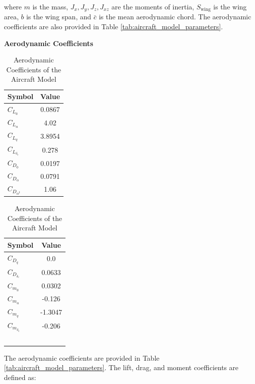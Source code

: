 \documentclass[journal,article,submit,pdftex,moreauthors]{Definitions/mdpi}
\begin{document}
where \(m\) is the mass, \(J_x, J_y, J_z, J_{xz}\) are the moments of inertia, \(S_{\text{wing}}\) is the wing area, \(b\) is the wing span, and \(\bar{c}\) is the mean aerodynamic chord. The aerodynamic coefficients are also provided in Table \ref{tab:aircraft_model_parameters}.

\begin{table}[H]
    \centering
    \label{tab:aero_coefficients}
    \textbf{Aerodynamic Coefficients} \\ %
    \vspace{0.5cm} %
    \begin{adjustbox}{valign=t}
    \begin{minipage}[t]{0.45\textwidth} %
        \centering
        \begin{tabular}{|l|c|}
            \hline
            \textbf{Symbol} & \textbf{Value} \\ \hline
            \( C_{L_0} \) & 0.0867 \\ \hline
            \( C_{L_\alpha} \) & 4.02 \\ \hline
            \( C_{L_q} \) & 3.8954 \\ \hline
            \( C_{L_{\delta_e}} \) & 0.278 \\ \hline
            \( C_{D_0} \) & 0.0197 \\ \hline
            \( C_{D_\alpha} \) & 0.0791 \\ \hline
            \( C_{D_{\alpha^2}} \) & 1.06 \\ \hline
        \end{tabular}
    \end{minipage}
    \end{adjustbox}
    \hfill
    \begin{adjustbox}{valign=t}
    \begin{minipage}[t]{0.45\textwidth} %
        \centering
        \begin{tabular}{|l|c|}
            \hline
            \textbf{Symbol} & \textbf{Value} \\ \hline
            \( C_{D_q} \) & 0.0 \\ \hline
            \( C_{D_{\delta_e}} \) & 0.0633 \\ \hline
            \( C_{m_0} \) & 0.0302 \\ \hline
            \( C_{m_\alpha} \) & -0.126 \\ \hline
            \( C_{m_q} \) & -1.3047 \\ \hline
            \( C_{m_{\delta_e}} \) & -0.206 \\ \hline
            \( \) & \( \) \\ \hline %
        \end{tabular}
    \end{minipage}
    \end{adjustbox}
    \caption{Aerodynamic Coefficients of the Aircraft Model}
\end{table}
The aerodynamic coefficients are provided in Table \ref{tab:aircraft_model_parameters}. The lift, drag, and moment coefficients are defined as:
\end{document}

